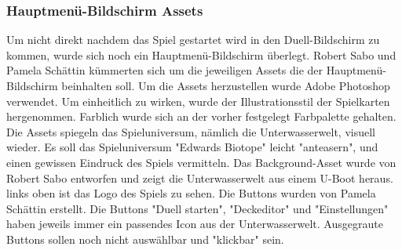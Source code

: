\subsubsection{Hauptmenü-Bildschirm Assets}
Um nicht direkt nachdem das Spiel gestartet wird in den Duell-Bildschirm zu kommen, wurde sich noch ein Hauptmenü-Bildschirm überlegt. Robert Sabo und Pamela Schättin kümmerten sich um die jeweiligen Assets die der Hauptmenü-Bildschirm beinhalten soll. Um die Assets herzustellen wurde Adobe Photoshop verwendet. Um einheitlich zu wirken, wurde der Illustrationsstil der Spielkarten hergenommen. Farblich wurde sich an der vorher festgelegt Farbpalette gehalten. Die Assets spiegeln das Spieluniversum, nämlich die Unterwasserwelt, visuell wieder. Es soll das Spieluniversum "Edwards Biotope" leicht "anteasern", und einen gewissen Eindruck des Spiels vermitteln. Das Background-Asset wurde von Robert Sabo entworfen und zeigt die Unterwasserwelt aus einem U-Boot heraus. links oben ist das Logo des Spiels zu sehen. Die Buttons wurden von Pamela Schättin erstellt. Die Buttons "Duell starten", "Deckeditor" und "Einstellungen" haben jeweils immer ein passendes Icon aus der Unterwasserwelt. Ausgegraute Buttons sollen noch nicht auswählbar und "klickbar" sein.

